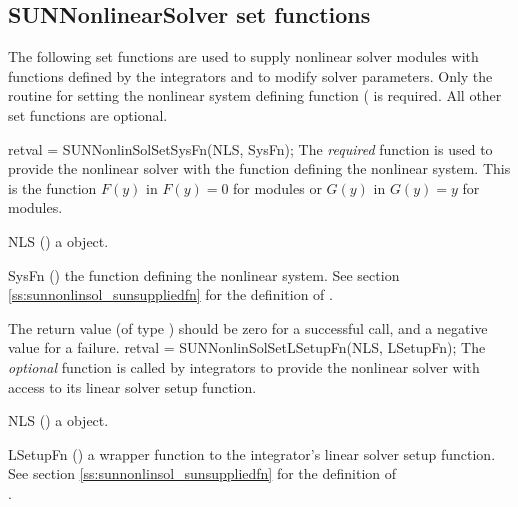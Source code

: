 \subsection{SUNNonlinearSolver set functions}
\label{ss:sunnonlinsol_setfn}
The following set functions are used to supply nonlinear solver modules with
functions defined by the {\sundials} integrators and to modify solver
parameters. Only the routine for setting the nonlinear system defining function
( is required. All other set functions are optional.

{
  retval = SUNNonlinSolSetSysFn(NLS, SysFn);
}
{
  The \textit{required} function  is used
  to provide the nonlinear solver with the function defining the
  nonlinear system. This is the function $F(y)$ in $F(y)=0$ for
   modules or $G(y)$ in $G(y)=y$ for\\
   modules.
}
{
  \begin{args}[SysFn]
  \item[NLS] ()
    a {\sunnonlinsol} object.
  \item[SysFn] ()
    the function defining the nonlinear system. See section
    \ref{ss:sunnonlinsol_sunsuppliedfn} for the definition of
    .
  \end{args}
}
{
  The return value  (of type ) should be zero for a
  successful call, and a negative value for a failure.
}
{}
{
  retval = SUNNonlinSolSetLSetupFn(NLS, LSetupFn);
}
{
  The \textit{optional} function  is called
  by {\sundials} integrators to provide the nonlinear solver with
  access to its linear solver setup function.
}
{
  \begin{args}[LSetupFn]
  \item[NLS] ()
    a {\sunnonlinsol} object.
  \item[LSetupFn] ()
    a wrapper function to the {\sundials} integrator's linear solver setup
    function. See section \ref{ss:sunnonlinsol_sunsuppliedfn} for the
    definition of \\ \noindent
    .
  \end{args}
}
